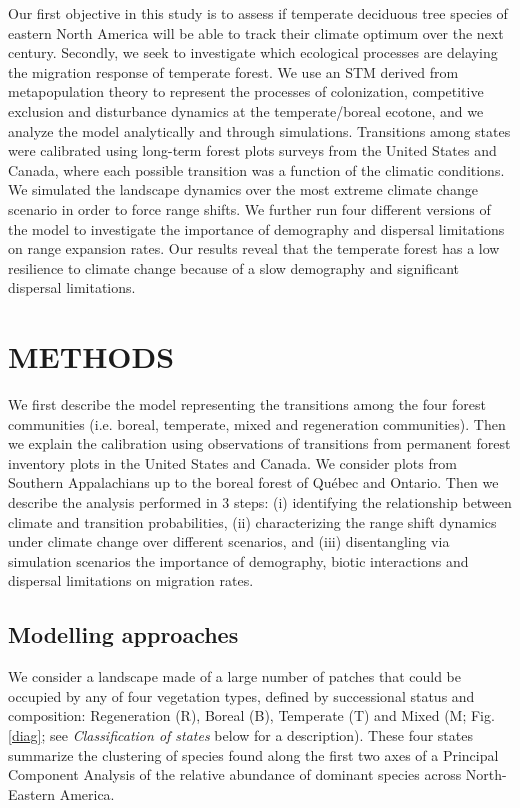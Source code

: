 Our first objective in this study is to assess if temperate deciduous tree species of eastern North
America will be able to track their climate optimum over the next century. Secondly, we seek to
investigate which ecological processes are delaying the migration response of temperate forest. We
use an STM derived from metapopulation theory to represent the processes of colonization,
competitive exclusion and disturbance dynamics at the temperate/boreal ecotone, and we analyze the
model analytically and through simulations. Transitions among states were
calibrated using long-term forest plots surveys from the United States and Canada, where each
possible transition was a function of the climatic conditions. We simulated the landscape dynamics
over the most extreme climate change scenario \citep[RCP 8.5,][]{Taylor2012} in order to force range
shifts. We further run four different versions of the model to investigate the importance of
demography and dispersal limitations on range expansion rates. Our results reveal that the temperate
forest has a low resilience to climate change because of a slow demography and significant dispersal
limitations.

\cleardoublepage

\section*{\uppercase{Methods}}

We first describe the model representing the transitions among the four forest communities (i.e. boreal, temperate, mixed and regeneration communities). Then we explain the calibration using observations of transitions from permanent forest inventory plots in the United States and Canada. We consider plots from Southern Appalachians up to the boreal forest of Québec and Ontario.
Then we describe the analysis performed in 3 steps: (i) identifying the relationship between climate and transition probabilities, (ii) characterizing the range shift dynamics under climate change over different scenarios, and (iii) disentangling via simulation scenarios the importance of demography, biotic interactions and dispersal limitations on migration rates.

\subsection*{Modelling approaches}

We consider a landscape made of a large number of patches that could be occupied by any of four
vegetation types, defined by successional status and composition: Regeneration (R), Boreal (B),
Temperate (T) and Mixed (M; Fig.\ref{diag}; see \emph{Classification of states} below for a
description). These four states summarize the clustering of species found along the first two axes
of a Principal Component Analysis of the relative abundance of dominant species across North-Eastern
America.

